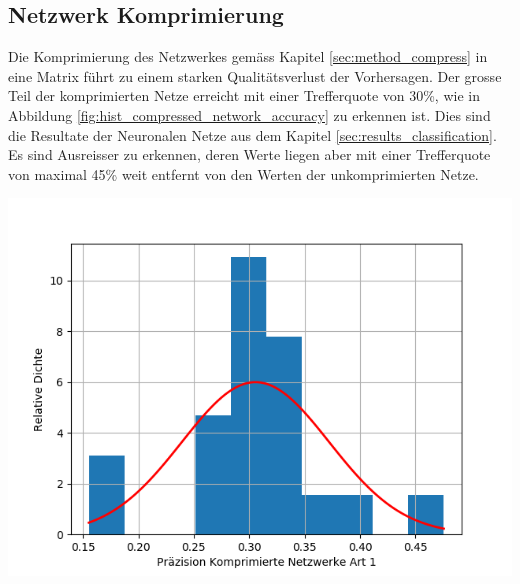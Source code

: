 \documentclass[Interploate_hadwritten_Digits.tex]{subfiles}
\begin{document}
	\subsection{Netzwerk Komprimierung}
	\label{sec:results_compression}
	Die Komprimierung des Netzwerkes gemäss Kapitel \ref{sec:method_compress} in eine Matrix führt zu einem starken Qualitätsverlust der Vorhersagen. Der grosse Teil der komprimierten Netze erreicht mit einer Trefferquote von 30\%, wie in Abbildung \ref{fig:hist_compressed_network_accuracy} zu erkennen ist. Dies sind die Resultate der Neuronalen Netze aus dem Kapitel \ref{sec:results_classification}. Es sind Ausreisser zu erkennen, deren Werte liegen aber mit einer Trefferquote von maximal 45\% weit entfernt von den Werten der unkomprimierten Netze.
	\begin{Figure}
		\centering
		\includegraphics[width=\linewidth]{img/results/histogram_compressed_network_accuracy.png}
		\label{fig:hist_compressed_network_accuracy}
	\end{Figure}
\end{document}
